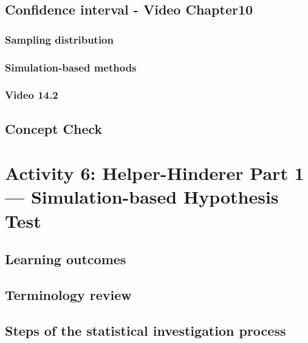 \documentclass[
]{report}
\begin{document}
\subsection*{Confidence interval - Video Chapter10}\label{confidence-interval---video-chapter10}

\subsubsection*{Sampling distribution}\label{sampling-distribution}

\subsubsection*{Simulation-based methods}\label{simulation-based-methods}

\subsubsection*{Video 14.2}\label{video-14.2}

\subsection{Concept Check}\label{concept-check-3}

\section{Activity 6: Helper-Hinderer Part 1 --- Simulation-based Hypothesis Test}\label{activity-6-helper-hinderer-part-1-simulation-based-hypothesis-test}

\subsection{Learning outcomes}\label{learning-outcomes-5}

\subsection{Terminology review}\label{terminology-review-5}

\subsection{Steps of the statistical investigation process}\label{steps-of-the-statistical-investigation-process-2}
\end{document}
